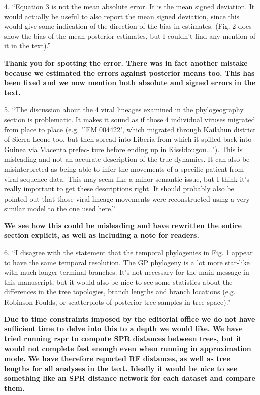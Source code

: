 \documentclass[11pt,oneside,letterpaper]{article}
\begin{document}
4. ``Equation 3 is not the mean absolute error. It is the mean signed deviation. It would actually be useful to also report the mean signed deviation, since this would give some indication of the direction of the bias in estimates. (Fig. 2 does show the bias of the mean posterior estimates, but I couldn't find any mention of it in the text).''

\textbf{Thank you for spotting the error. There was in fact another mistake because we estimated the errors against posterior means too. This has been fixed and we now mention both absolute and signed errors in the text.}

5. ``The discussion about the 4 viral lineages examined in the phylogeography section is problematic. It makes it sound as if those 4 individual viruses migrated from place to place (e.g. "'EM 004422', which migrated through Kailahun district of Sierra Leone too, but then spread into Liberia from which it spilled back into Guinea via Macenta prefec- ture before ending up in Kissidougou..."). This is misleading and not an accurate description of the true dynamics. It can also be misinterpreted as being able to infer the movements of a specific patient from viral sequence data. This may seem like a minor semantic issue, but I think it's really  important to get these descriptions right. It should probably also be pointed out that those viral lineage movements were reconstructed using a very similar model to the one used here.''

\textbf{We see how this could be misleading and have rewritten the entire section explicit, as well as including a note for readers.}

6. ``I disagree with the statement that the temporal phylogenies in Fig. 1 appear to have the same temporal resolution. The GP phylogeny is a lot more star-like with much longer terminal branches. It's not necessary for the main message in this manuscript, but it would also be nice to see some statistics about the differences in the tree topologies, branch lengths and branch locations (e.g. Robinson-Foulds, or scatterplots of posterior tree samples in tree space).''

\textbf{Due to time constraints imposed by the editorial office we do not have sufficient time to delve into this to a depth we would like. We have tried running rspr to compute SPR distances between trees, but it would not complete fast enough even when running in approximation mode. We have therefore reported RF distances, as well as tree lengths for all analyses in the text. Ideally it would be nice to see something like an SPR distance network for each dataset and compare them.}
\end{document}
